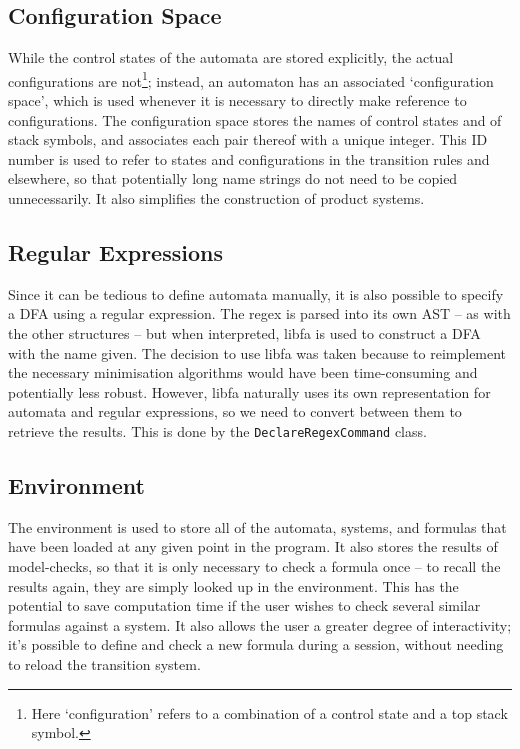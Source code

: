 \documentclass[11pt]{article}
\theoremstyle{definition}
\begin{document}
\subsection{Configuration Space}

While the control states of the automata are stored explicitly, the actual
configurations are not\footnote{Here `configuration' refers to a combination of
a control state and a top stack symbol.}; instead, an automaton has an
associated `configuration space', which is used whenever it is necessary to
directly make reference to configurations. The configuration space stores the
names of control states and of stack symbols, and associates each pair thereof
with a unique integer. This ID number is used to refer to states and
configurations in the transition rules and elsewhere, so that potentially long
name strings do not need to be copied unnecessarily. It also simplifies the
construction of product systems.





\subsection{Regular Expressions}
Since it can be tedious to define automata manually, it is also possible to
specify a DFA using a regular expression. The regex is parsed into its own AST
-- as with the other structures -- but when interpreted, libfa is used to
construct a DFA with the name given. The decision to use libfa was taken
because to reimplement the necessary minimisation algorithms would have been
time-consuming and potentially less robust. However, libfa naturally uses its
own representation for automata and regular expressions, so we need to convert
between them to retrieve the results. This is done by the
\texttt{DeclareRegexCommand} class.

\subsection{Environment}

The environment is used to store all of the automata, systems, and formulas
that have been loaded at any given point in the program. It also stores the
results of model-checks, so that it is only necessary to check a formula once
-- to recall the results again, they are simply looked up in the environment.
This has the potential to save computation time if the user wishes to check
several similar formulas against a system. It also allows the user a greater
degree of interactivity; it's possible to define and check a new formula during
a session, without needing to reload the transition system.
\end{document}
